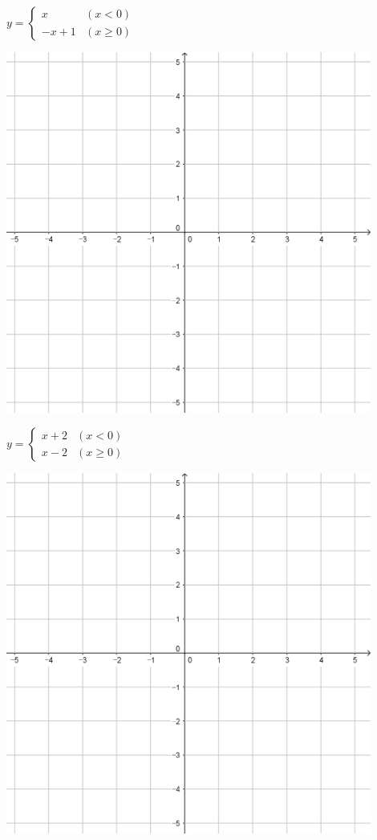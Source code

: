 \documentclass{oblivoir}
\begin{document}
\clearpage
\begin{minipage}{0.45\textwidth}\centering
\(y=\begin{cases}x&(x<0)\\-x+1&(x\ge0)\end{cases}\)
\par\bigskip\includegraphics[width=0.9\textwidth]{55}
\end{minipage}
\begin{minipage}{0.45\textwidth}\centering
\(y=\begin{cases}x+2&(x<0)\\x-2&(x\ge0)\end{cases}\)
\par\bigskip\includegraphics[width=0.9\textwidth]{55}
\end{minipage}\bigskip\bigskip\par
\end{document}
